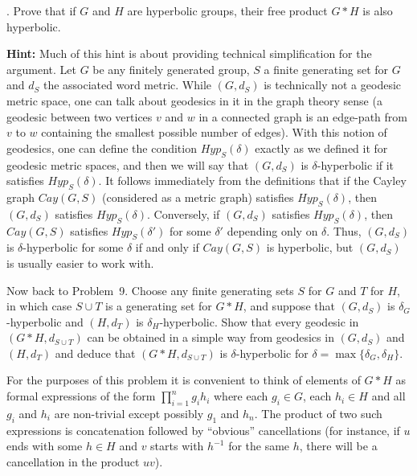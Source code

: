 \documentclass[12pt]{amsart}
\begin{document}
. Prove that if $G$ and $H$ are hyperbolic groups, their free product $G*H$ is also hyperbolic. 

{\bf Hint:} Much of this hint is about providing technical simplification for the argument.
Let $G$ be any finitely generated group, $S$ a finite generating set for $G$ and $d_S$ the associated word metric.
While $(G,d_S)$ is technically not a geodesic metric space, one can talk about geodesics in it in the graph theory
sense (a geodesic between two vertices $v$ and $w$ in a connected graph is an edge-path from $v$ to $w$ containing the smallest possible number of edges). With this notion of geodesics, one can define the condition $Hyp_S(\delta)$ exactly as we defined it for geodesic metric spaces,
and then we will say that $(G,d_S)$ is $\delta$-hyperbolic if it satisfies $Hyp_S(\delta)$. It follows immediately from the definitions that if the Cayley graph $Cay(G,S)$ (considered as a metric graph) satisfies $Hyp_S(\delta)$, then $(G,d_S)$ satisfies $Hyp_S(\delta)$. Conversely, if $(G,d_S)$ satisfies $Hyp_S(\delta)$, then $Cay(G,S)$ satisfies $Hyp_S(\delta')$ for some
$\delta'$ depending only on $\delta$. Thus, $(G,d_S)$ is $\delta$-hyperbolic for some $\delta$ if and only if $Cay(G,S)$
is hyperbolic, but $(G,d_S)$ is usually easier to work with.


Now back to Problem~9. Choose any finite generating sets $S$ for $G$ and $T$ for $H$, in which case $S\cup T$ is a generating set for $G*H$, and suppose that $(G,d_S)$ is $\delta_G$-hyperbolic and $(H,d_T)$ is $\delta_H$-hyperbolic. 
Show that every geodesic in $(G*H,d_{S\cup T})$ can be obtained in a simple way from geodesics in
$(G,d_S)$ and $(H,d_T)$ and deduce that $(G*H,d_{S\cup T})$ is $\delta$-hyperbolic for $\delta=\max\{\delta_G,\delta_H\}$.

For the purposes of this problem it is convenient to think of elements of $G*H$ as formal expressions of the form 
$\prod_{i=1}^n g_i h_i$ where each $g_i\in G$, each $h_i\in H$ and all $g_i$ and $h_i$ are non-trivial except possibly
$g_1$ and $h_n$. The product of two such expressions is concatenation followed by ``obvious'' cancellations
(for instance, if $u$ ends with some $h\in H$ and $v$ starts with $h^{-1}$ for the same $h$, there will be a cancellation in the product $uv$).
\end{document}
